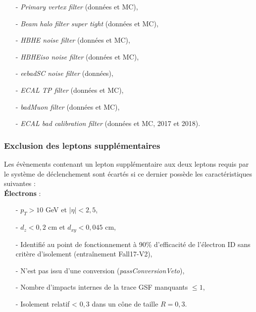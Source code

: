 \begin{itemize}
\bigskip
    \item[-] \textit{Primary vertex filter} (données et MC),
        \smallskip
    \item[-] \textit{Beam halo filter super tight} (données et MC),
        \smallskip
    \item[-] \textit{HBHE noise filter} (données et MC),
        \smallskip
    \item[-] \textit{HBHEiso noise filter} (données et MC),
        \smallskip
    \item[-] \textit{eebadSC noise filter} (données),
        \smallskip
    \item[-] \textit{ECAL TP filter} (données et MC),
        \smallskip
    \item[-] \textit{badMuon filter} (données et MC),
        \smallskip
    \item[-] \textit{ECAL bad calibration filter} (données et MC, 2017 et 2018).
    \bigskip
\end{itemize}

\subsubsection{ Exclusion des leptons supplémentaires}

Les évènements contenant un lepton supplémentaire aux deux leptons requis par le système de déclenchement sont écartés si ce dernier possède les caractéristiques suivantes : \\


\textbf{Électrons} :

\begin{itemize}
\bigskip
    \item[-] $p_{T}>10$ GeV et $|\eta|<2,5$,
        \smallskip
    \item[-] $d_z<0,2$ cm et $d_{xy}<0,045$ cm,
        \smallskip
    \item[-] Identifié au point de fonctionnement à 90\% 
    d'efficacité de l'électron ID sans critère d'isolement (entraînement Fall17-V2),
        \smallskip
    \item[-] N'est pas issu d'une conversion (\textit{passConversionVeto}),
        \smallskip
    \item[-] Nombre d'impacts internes de la trace GSF manquants $\leq 1$, 
        \smallskip
    \item[-] Isolement relatif < $0,3$ dans un cône de taille $R=0,3$. 
    \bigskip
\end{itemize}

